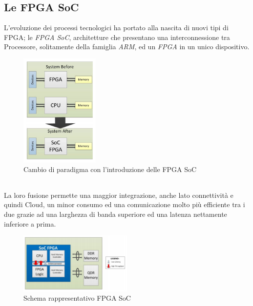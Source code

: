 \subsection{Le FPGA SoC}
L'evoluzione dei processi tecnologici ha portato alla nascita di nuovi tipi di FPGA; le\textit{ FPGA SoC}, architetture che presentano una interconnessione tra Processore, solitamente della famiglia \textit{ARM}, ed un \textit{FPGA} in un unico dispositivo.
\begin{figure}[h]
\centering
\includegraphics[width=0.35\textwidth]{images/Capture1.png}
\caption{Cambio di paradigma con l'introduzione delle FPGA SoC}
\end{figure}\\
La loro fusione permette una maggior integrazione, anche lato connettività e quindi Cloud, un minor consumo ed una comunicazione molto più efficiente tra i due grazie ad una larghezza di banda superiore ed una latenza nettamente inferiore a prima.
\begin{figure}[h]
\centering
\includegraphics[width=0.5\textwidth]{images/Capture8.png}
\caption{Schema rappresentativo FPGA SoC}
\end{figure}
